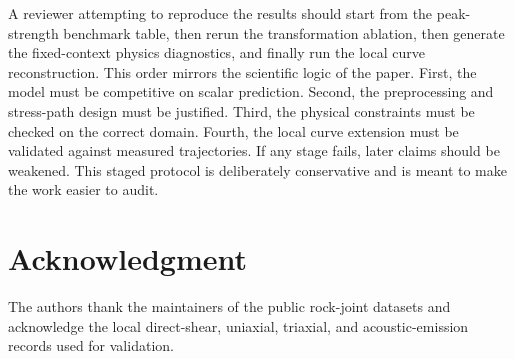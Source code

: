 \documentclass[journal]{IEEEtran}
\begin{document}
A reviewer attempting to reproduce the results should start from the peak-strength benchmark table, then rerun the transformation ablation, then generate the fixed-context physics diagnostics, and finally run the local curve reconstruction. This order mirrors the scientific logic of the paper. First, the model must be competitive on scalar prediction. Second, the preprocessing and stress-path design must be justified. Third, the physical constraints must be checked on the correct domain. Fourth, the local curve extension must be validated against measured trajectories. If any stage fails, later claims should be weakened. This staged protocol is deliberately conservative and is meant to make the work easier to audit.
\section*{Acknowledgment}
The authors thank the maintainers of the public rock-joint datasets and acknowledge the local direct-shear, uniaxial, triaxial, and acoustic-emission records used for validation.

\nocite{yang2021bpinn,huber1964robust,donoho2006compressed}


\end{document}
